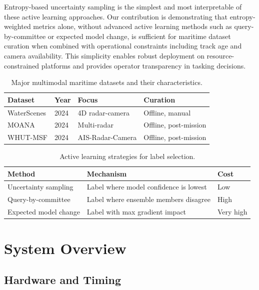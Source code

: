 \documentclass[conf]{asmeconf}
\begin{document}
Entropy-based uncertainty sampling is the simplest and most interpretable of these active learning approaches. Our contribution is demonstrating that entropy-weighted metrics alone, without advanced active learning methods such as query-by-committee or expected model change, is sufficient for maritime dataset curation when combined with operational constraints including track age and camera availability. This simplicity enables robust deployment on resource-constrained platforms and provides operator transparency in tasking decisions.

\begin{table}[t]
\caption{Major multimodal maritime datasets and their characteristics.}
\label{tab:maritime_datasets}
\centering
\footnotesize
\begin{tabular}{@{}llll@{}}
\toprule
Dataset & Year & Focus & Curation \\
\midrule
WaterScenes & 2024 & 4D radar-camera & Offline, manual \\
\midrule
MOANA & 2024 & Multi-radar & Offline, post-mission \\
\midrule
WHUT-MSF & 2024 & AIS-Radar-Camera & Offline, post-mission \\
\bottomrule
\end{tabular}
\end{table}

\begin{table}[t]
\caption{Active learning strategies for label selection.}
\label{tab:active_learning_methods}
\centering
\small
\begin{tabular}{@{}lp{3cm}p{2cm}@{}}
\toprule
Method & Mechanism & Cost \\
\midrule
Uncertainty sampling & Label where model confidence is lowest & Low \\
\midrule
Query-by-committee & Label where ensemble members disagree & High \\
\midrule
Expected model change & Label with max gradient impact & Very high \\
\bottomrule
\end{tabular}
\end{table}

\section{System Overview}

\subsection{Hardware and Timing}
\end{document}
